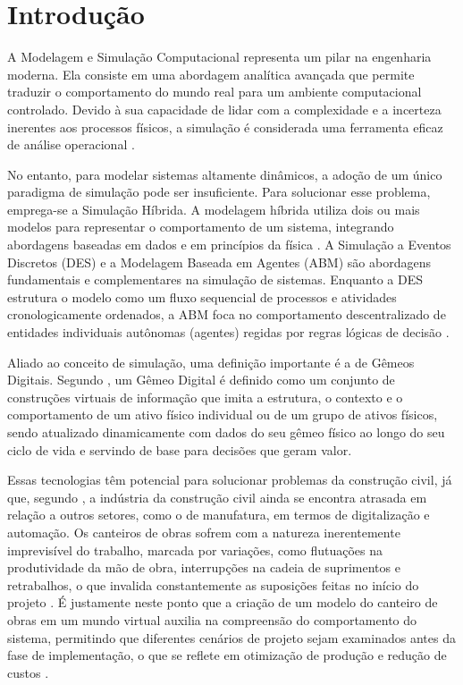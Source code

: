 \chapter{Introdução}
\label{chap:intro}
A Modelagem e Simulação Computacional representa um pilar na engenharia moderna. Ela consiste em uma abordagem analítica avançada que permite traduzir o comportamento do mundo real para um ambiente computacional controlado. Devido à sua capacidade de lidar com a complexidade e a incerteza inerentes aos processos físicos, a simulação é considerada uma ferramenta eficaz de análise operacional \cite{halpin2003}.


No entanto, para modelar sistemas altamente dinâmicos, a adoção de um único paradigma de simulação pode ser insuficiente. Para solucionar esse problema, emprega-se a Simulação Híbrida. A modelagem híbrida utiliza dois ou mais modelos para representar o comportamento de um sistema, integrando abordagens baseadas em dados e em princípios da física \cite{hybridmodeling}. A Simulação a Eventos Discretos (DES) e a Modelagem Baseada em Agentes (ABM) são abordagens fundamentais e complementares na simulação de sistemas. Enquanto a DES estrutura o modelo como um fluxo sequencial de processos e atividades cronologicamente ordenados, a ABM foca no comportamento descentralizado de entidades individuais autônomas (agentes) regidas por regras lógicas de decisão \cite{Macal2009, Banks2005}.

Aliado ao conceito de simulação, uma definição importante é a de Gêmeos Digitais. Segundo , um Gêmeo Digital é definido como um conjunto de construções virtuais de informação que imita a estrutura, o contexto e o comportamento de um ativo físico individual ou de um grupo de ativos físicos, sendo atualizado dinamicamente com dados do seu gêmeo físico ao longo do seu ciclo de vida e servindo de base para decisões que geram valor.

Essas tecnologias têm potencial para solucionar problemas da construção civil, já que, segundo , a indústria da construção civil ainda se encontra atrasada em relação a outros setores, como o de manufatura, em termos de digitalização e automação. Os canteiros de obras sofrem com a natureza inerentemente imprevisível do trabalho, marcada por variações, como flutuações na produtividade da mão de obra, interrupções na cadeia de suprimentos e retrabalhos, o que invalida constantemente as suposições feitas no início do projeto \cite{wambeke2011variation}. É justamente neste ponto que a criação de um modelo do canteiro de obras em um mundo virtual auxilia na compreensão do comportamento do sistema, permitindo que diferentes cenários de projeto sejam examinados antes da fase de implementação, o que se reflete em otimização de produção e redução de custos \cite{hybridframework}.

